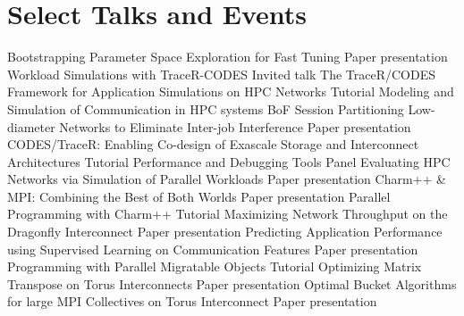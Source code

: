 \section{Select Talks and Events}
    {Bootstrapping Parameter Space Exploration for Fast Tuning}
    {Paper presentation}
    {}{}
		{Workload Simulations with TraceR-CODES}
		{Invited talk}
		{}{}
		{The TraceR/CODES Framework for Application Simulations on HPC Networks}
		{Tutorial}
		{}{}
		{Modeling and Simulation of Communication in HPC systems}
		{BoF Session}
		{}{}
		{Partitioning Low-diameter Networks to Eliminate Inter-job Interference}
    {Paper presentation}
		{}{}
		{CODES/TraceR: Enabling Co-design of Exascale Storage and Interconnect Architectures}
		{Tutorial}
		{}{}
		{Performance and Debugging Tools}
		{Panel}
		{}{}
		{Evaluating HPC Networks via Simulation of Parallel Workloads}
    {Paper presentation}
		{}{}
		{Charm++ \& MPI: Combining the Best of Both Worlds}
    {Paper presentation}
		{}{}
		{Parallel Programming with Charm++}
		{Tutorial}
		{}{}
		{Maximizing Network Throughput on the Dragonfly Interconnect}
    {Paper presentation}
		{}{}
		{Predicting Application Performance using Supervised Learning on Communication Features}
    {Paper presentation}
		{}{}
		{Programming with Parallel Migratable Objects}
		{Tutorial}
		{}{}
		{Optimizing Matrix Transpose on Torus Interconnects}
    {Paper presentation}
		{}{}
		{Optimal Bucket Algorithms for large MPI Collectives on Torus Interconnect}
    {Paper presentation}
		{}{}


